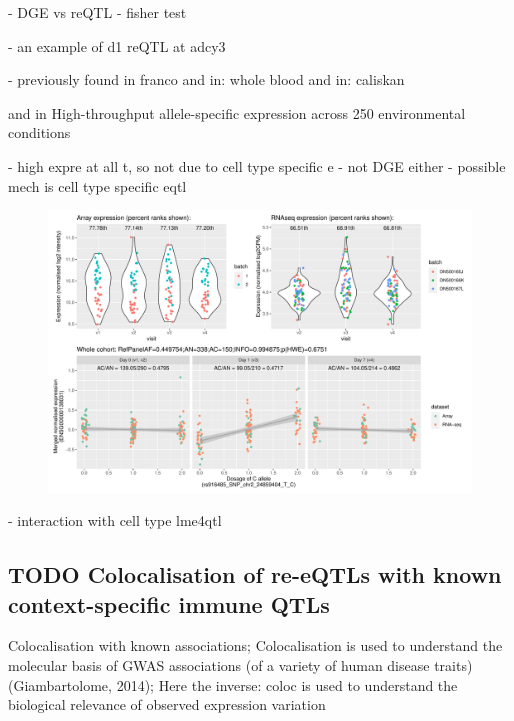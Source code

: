 - DGE vs reQTL
- fisher test

- an example of d1 reQTL at adcy3

- previously found in franco
and in:
whole blood
and in: 
caliskan

and in High-throughput allele-specific expression across 250 environmental conditions

- high expre at all t, so not due to cell type specific e
- not DGE either
- possible mech is cell type specific eqtl

\begin{figure}
    \centering
    \includegraphics[width=1.0\textwidth,page=1]{mainmatter/figures/chapter_03/plot_dge_eqtl_genotypes.ENSG00000138031,rs916485_SNP_chr2_24859404_T_C.pdf}
    \caption{}
    \label{fig:hird_eQTL_ADCY3}
\end{figure}

- interaction with cell type lme4qtl

\subsection{TODO Colocalisation of re-eQTLs with known context-specific immune QTLs}

Colocalisation with known associations;
Colocalisation is used to understand the molecular basis of GWAS associations (of a variety of human disease traits) (Giambartolome, 2014);
Here the inverse: coloc is used to understand the biological relevance of observed expression variation

